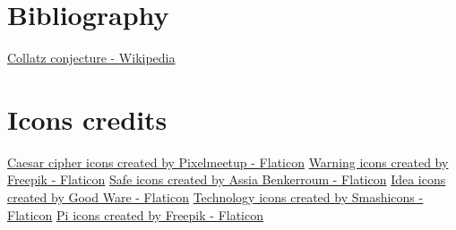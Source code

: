 \documentclass{article}
\begin{document}
\section{Bibliography}

\href{https://en.wikipedia.org/wiki/Collatz_conjecture}{Collatz conjecture - Wikipedia}


\section{Icons credits}

\href{https://www.flaticon.com/free-icons/caesar-cipher}{Caesar cipher icons created by Pixelmeetup - Flaticon}
\newline
\href{https://www.flaticon.com/free-icons/warning}{Warning icons created by Freepik - Flaticon}
\newline
\href{https://www.flaticon.com/free-icons/safe}{Safe icons created by Assia Benkerroum  - Flaticon}
\newline
\href{https://www.flaticon.com/free-icons/idea}{Idea icons created by Good Ware - Flaticon}
\newline
\href{https://www.flaticon.com/free-icons/technology}{Technology icons created by Smashicons - Flaticon}
\newline
\href{https://www.flaticon.com/free-icons/pi}{Pi icons created by Freepik - Flaticon}
\end{document}
